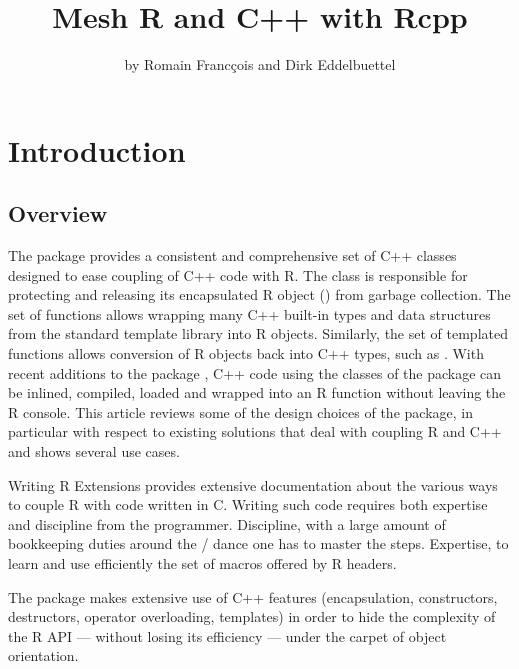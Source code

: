 \title{Mesh R and C++ with Rcpp}
\author{by Romain Franc\c{c}ois and Dirk Eddelbuettel}

\maketitle


\section{Introduction}

\subsection{Overview}
The  package provides a consistent and comprehensive set 
of C++ classes designed to ease coupling of C++ code
with R. The  class is responsible for 
protecting and releasing its encapsulated R object ()
from garbage collection. The  set of functions allows
wrapping many C++ built-in types and data structures from the standard
template library into R objects. Similarly, the  set of 
templated functions allows conversion of R objects back into C++
types, such as . With recent additions to the 
 package \citep{cran:inline}, 
C++ code using the classes of the 
 package can be inlined, compiled, loaded and wrapped 
into an R function without leaving the R console. 
This article reviews some of the design choices of the
 package, in particular with respect to existing solutions
that deal with coupling R and C++ and shows several use cases.

Writing R Extensions \citep{R:exts} provides extensive documentation about the 
various ways to couple R with code written in C. 
Writing such code requires both expertise and discipline from the 
programmer. Discipline, with a large amount of bookkeeping 
duties around the / dance one 
has to master the steps. Expertise, to learn and use efficiently 
the set of macros offered by R headers. 

The  package makes extensive use of C++ features (encapsulation, 
constructors, destructors, operator overloading, templates) in order
to hide the complexity of the R API --- without losing its 
efficiency --- under the carpet of object orientation. 

